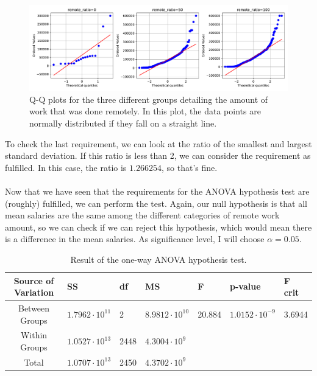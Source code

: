 \documentclass{article}
\begin{document}
\begin{figure}[h!]
  \centering
  \includegraphics[scale=0.50]{fig/probplot.pdf}
  \caption{Q-Q plots for the three different groups detailing the amount of work that was done remotely. In this plot, the data points are normally distributed if they fall on a straight line.}
\end{figure}

To check the last requirement, we can look at the ratio of the smallest and largest standard deviation. If this ratio is less than 2, we can consider the requirement as fulfilled. In this case, the ratio is $1.266254$, so that's fine. \\ \\

Now that we have seen that the requirements for the ANOVA hypothesis test are (roughly) fulfilled, we can perform the test. Again, our null hypothesis is that all mean salaries are the same among the different categories of remote work amount, so we can check if we can reject this hypothesis, which would mean there is a difference in the mean salaries. As significance level, I will choose $\alpha = 0.05$.

\begin{table}[h!]
  \caption{Result of the one-way ANOVA hypothesis test.}
  \label{sample-table}
  \centering
  \begin{tabular}{cllllll}
    \toprule
    Source of Variation & SS & df & MS & F & p-value & F crit \\
    \midrule
    Between Groups & $1.7962 \cdot 10^{11}$ & 2		& $8.9812 \cdot 10^{10}$ & 20.884 & $1.0152 \cdot 10^{-9}$ & 3.6944 \\
    Within Groups  & $1.0527 \cdot 10^{13}$ & 2448	& $4.3004 \cdot 10^{9}$ & & & \\
    Total     &      $1.0707 \cdot 10^{13}$ & 2450	& $4.3702 \cdot 10^{9}$ & & & \\
    \bottomrule
  \end{tabular}
\end{table}
\end{document}
